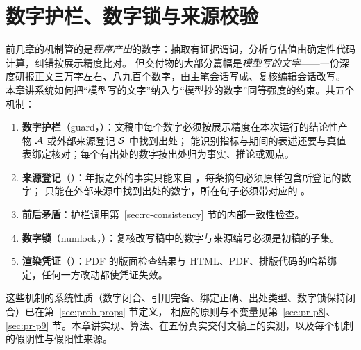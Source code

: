 \section{数字护栏、数字锁与来源校验}
\label{sec:guards}

前几章的机制管的是\emph{程序产出}的数字：抽取有证据谓词，分析与估值由确定性代码计算，纠错按展示精度比对。
但交付物的大部分篇幅是\emph{模型写的文字}——一份深度研报正文三万字左右、八九百个数字，由主笔会话写成、复核编辑会话改写。
本章讲系统如何把“模型写的文字”纳入与“模型抄的数字”同等强度的约束。共五个机制：
\begin{enumerate}
\item \textbf{数字护栏}（guard，）：文稿中每个数字必须按展示精度在本次运行的结论性产物 $\mathcal{A}$ 或外部来源登记 $\mathcal{S}$ 中找到出处；
  能识别指标与期间的表述还要与真值表绑定核对；每个有出处的数字按出处归为事实、推论或观点。
\item \textbf{来源登记}（）：年报之外的事实只能来自 ，每条摘句必须原样包含所登记的数字；
  只能在外部来源中找到出处的数字，所在句子必须带对应的 \code{[S编号]}。
\item \textbf{前后矛盾}：护栏调用第~\ref{sec:rc-consistency} 节的内部一致性检查。
\item \textbf{数字锁}（numlock，）：复核改写稿中的数字与来源编号必须是初稿的子集。
\item \textbf{渲染凭证}（）：PDF 的版面检查结果与 HTML、PDF、排版代码的哈希绑定，任何一方改动都使凭证失效。
\end{enumerate}
这些机制的系统性质（数字闭合、引用完备、绑定正确、出处类型、数字锁保持闭合）已在第~\ref{sec:prob-props} 节定义，
相应的原则与不变量见第~\ref{sec:pr-p8}、\ref{sec:pr-p9} 节。本章讲实现、算法、在五份真实交付文稿上的实测，以及每个机制的假阴性与假阳性来源。

